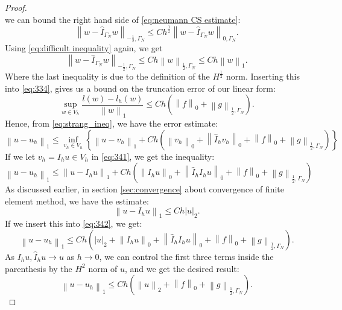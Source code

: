 \documentclass[../Main/main.tex]{subfiles}
\begin{document}
\begin{proof}
\begin{equation}
		\end{equation}
		we can bound the right hand side of  \eqref{eq:neumann CS estimate}: 
		\begin{equation}
				\left \|w-\hat{I}_{\Gamma_N} w\right \|_{-\frac{1}{2},\Gamma_N} \leq Ch^{\frac{1}{2}} \left \| w-\hat{I}_{\Gamma_N} w \right \|_{0,\Gamma_N}.
		\end{equation}
		Using \eqref{eq:difficult inequality} again, we get
		\begin{equation}
				\left \|w-\hat{I}_{\Gamma_N} w\right \|_{-\frac{1}{2},\Gamma_N} \leq Ch \left \|w\right \|_{\frac{1}{2},\Gamma_N} \leq Ch\left \| w \right \|_1.
		\end{equation}
		Where the last inequality is due to the definition of the $H^{\frac{1}{2}}$ norm. Inserting this into \eqref{eq:334}, gives us a bound on the truncation error of our linear form:
		\begin{equation}
			\sup_{w \in V_h} \frac{l(w)-l_h(w)}{\left \| w \right \|_1} \leq Ch(\left \|f \right \|_0 + \left \| g \right \|_{\frac{1}{2},\Gamma_N}).
		\end{equation}
		Hence, from \eqref{eq:strang_ineq}, we have the error estimate:
		\begin{equation}\label{eq:341}
					\left \| u - u_h \right \|_1 \leq \inf_{v_h \in V_h}\left \{ \left \| u - v_h \right \|_1 + Ch \left (\left \| v_h\right \|_0 + \left \| \hat{I}_h v_h \right \|_0 + \left \| f \right \|_0 + \left \| g \right \|_{\frac{1}{2},\Gamma_N}\right ) \right \}
		\end{equation}
	If we let $v_h = I_h u \in V_h$ in \eqref{eq:341}, we get the inequality:
	\begin{equation}\label{eq:342}
	\left \| u - u_h \right \|_1 \leq \left \| u - I_h u \right \|_1 + Ch \left (\left \| I_h u\right \|_0 + \left \| \hat{I}_h I_h u \right \|_0 + \left \| f \right \|_0 + \left \| g \right \|_{\frac{1}{2},\Gamma_N} \right )
	\end{equation}
	As discussed earlier, in section \ref{sec:convergence} about convergence of finite element method, we have the estimate:
	\begin{equation}
 \left \| u - I_h u \right \|_1 \leq C h|u|_2.
	\end{equation}
	If we insert this into \eqref{eq:342}, we get:
	\begin{equation}
	\left \| u - u_h \right \|_1 \leq  Ch \left ( |u|_2 + \left \| I_h u\right \|_0 + \left \| \hat{I}_h I_h u \right \|_0 + \left \| f \right \|_0 + \left \| g \right \|_{\frac{1}{2},\Gamma_N} \right ).
	\end{equation}
	As $I_h u, \hat{I}_h u \rightarrow u$ as $h\rightarrow 0$, we can control the first three terms inside the parenthesis by the $H^2$ norm of $u$, and we get the desired result:
	\begin{equation}
\left \| u - u_h \right \|_1 \leq  Ch \left ( \left \|u\right \|_2 + \left \| f \right \|_0 + \left \| g \right \|_{\frac{1}{2},\Gamma_N} \right ).	\end{equation}
	\end{proof}
\end{document}
